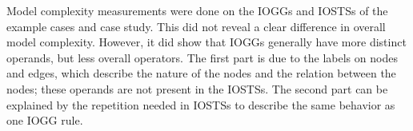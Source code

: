 Model complexity measurements were done on the IOGGs and IOSTSs of the example cases and case study. This did not reveal a clear difference in overall model complexity. However, it did show that IOGGs generally have more distinct operands, but less overall operators. The first part is due to the labels on nodes and edges, which describe the nature of the nodes and the relation between the nodes; these operands are not present in the IOSTSs. The second part can be explained by the repetition needed in IOSTSs to describe the same behavior as one IOGG rule.
